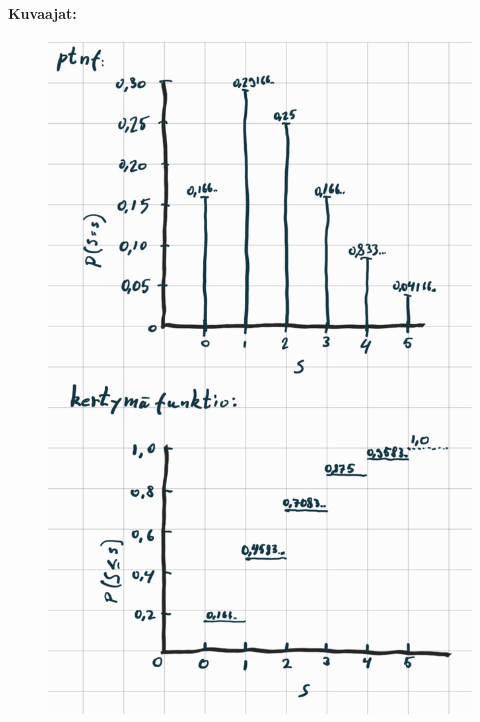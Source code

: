 \documentclass[12pt,a4paper]{article}
\begin{document}
\textbf{Kuvaajat:}


\begin{figure}[h]
  \centering
  \includegraphics[width=.6\textwidth]{viikko3tehtävä5.jpg}
\end{figure}






\pagebreak
\end{document}
